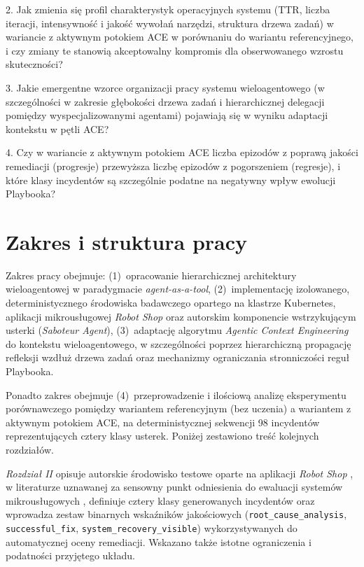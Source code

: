 2. Jak zmienia się profil charakterystyk operacyjnych systemu (TTR, liczba iteracji, intensywność i jakość wywołań narzędzi, struktura drzewa zadań) w wariancie z aktywnym potokiem ACE w porównaniu do wariantu referencyjnego, i czy zmiany te stanowią akceptowalny kompromis dla obserwowanego wzrostu skuteczności?

3. Jakie emergentne wzorce organizacji pracy systemu wieloagentowego (w szczególności w zakresie głębokości drzewa zadań i hierarchicznej delegacji pomiędzy wyspecjalizowanymi agentami) pojawiają się w wyniku adaptacji kontekstu w pętli ACE?

4. Czy w wariancie z aktywnym potokiem ACE liczba epizodów z poprawą jakości remediacji (progresje) przewyższa liczbę epizodów z pogorszeniem (regresje), i które klasy incydentów są szczególnie podatne na negatywny wpływ ewolucji Playbooka?

\section{Zakres i struktura pracy}

Zakres pracy obejmuje: (1)~opracowanie hierarchicznej architektury wieloagentowej w paradygmacie \textit{agent-as-a-tool}, (2)~implementację izolowanego, deterministycznego środowiska badawczego opartego na klastrze Kubernetes, aplikacji mikrousługowej \textit{Robot Shop} oraz autorskim komponencie wstrzykującym usterki (\textit{Saboteur Agent}), (3)~adaptację algorytmu \textit{Agentic Context Engineering} do kontekstu wieloagentowego, w szczególności poprzez hierarchiczną propagację refleksji wzdłuż drzewa zadań oraz mechanizmy ograniczania stronniczości reguł Playbooka. 

Ponadto zakres obejmuje (4)~przeprowadzenie i ilościową analizę eksperymentu porównawczego pomiędzy wariantem referencyjnym (bez uczenia) a wariantem z aktywnym potokiem ACE, na deterministycznej sekwencji 98 incydentów reprezentujących cztery klasy usterek. Poniżej zestawiono treść kolejnych rozdziałów.

\textit{Rozdział II} opisuje autorskie środowisko testowe oparte na aplikacji \textit{Robot Shop} \cite{instana_robot_shop}, w literaturze uznawanej za sensowny punkt odniesienia do ewaluacji systemów mikrousługowych \cite{fischer2024microservice_systems_mapping}, definiuje cztery klasy generowanych incydentów oraz wprowadza zestaw binarnych wskaźników jakościowych (\texttt{root\_cause\_analysis}, \texttt{successful\_fix}, \texttt{system\_recovery\_visible}) wykorzystywanych do automatycznej oceny remediacji. Wskazano także istotne ograniczenia i podatności przyjętego układu.

